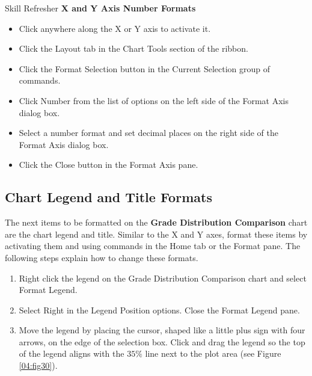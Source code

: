\begin{center}
	\begin{sklbox}{Skill Refresher}
		\textbf{X and Y Axis Number Formats}
		\\
		\begin{itemize}
			\setlength{\itemsep}{0pt}
			\setlength{\parskip}{0pt}
			\setlength{\parsep}{0pt}

			\item Click anywhere along the X or Y axis to activate it.
			\item Click the Layout tab in the Chart Tools section of the ribbon.
			\item Click the Format Selection button in the Current Selection group of commands.
			\item Click Number from the list of options on the left side of the Format Axis dialog box.
			\item Select a number format and set decimal places on the right side of the Format Axis dialog box.
			\item Click the Close button in the Format Axis pane.
			
		\end{itemize}
	\end{sklbox}
\end{center}

\subsection{Chart Legend and Title Formats}

The next items to be formatted on the \textbf{Grade Distribution Comparison} chart are the chart legend and title. Similar to the X and Y axes, format these items by activating them and using commands in the Home tab or the Format pane. The following steps explain how to change these formats.

\begin{enumerate}
	\item Right click the legend on the Grade Distribution Comparison chart and select Format Legend.
	\item Select Right in the Legend Position options. Close the Format Legend pane.
	\item Move the legend by placing the cursor, shaped like a little plus sign with four arrows, on the edge of the selection box. Click and drag the legend so the top of the legend aligns with the $ 35\% $ line next to the plot area (see Figure \ref{04:fig30}).
\end{enumerate}

